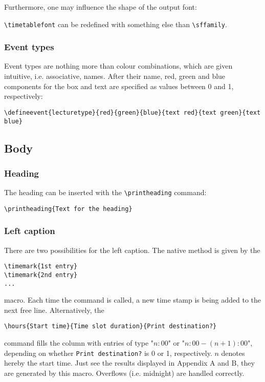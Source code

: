 \documentclass[a4paper,10pt]{article}
\begin{document}
Furthermore, one may influence the shape of the output font:
\begin{description}
\item \lstinline!\timetablefont! can be redefined with something else than \lstinline!\sffamily!.
\end{description}

\subsubsection{Event types}\label{defineevent}
Event types are nothing more than colour combinations, which are given intuitive, i.e. associative, names. After their name, red, green and blue components for the box and text are specified as values between 0 and 1, respectively:
\begin{lstlisting}
\defineevent{lecturetype}{red}{green}{blue}{text red}{text green}{text blue}
\end{lstlisting}

\subsection{Body}
\subsubsection{Heading}
The heading can be inserted with the \lstinline{\printheading} command:
\begin{lstlisting}
\printheading{Text for the heading}
\end{lstlisting}

\subsubsection{Left caption}
There are two possibilities for the left caption. The native method is given by the
\begin{lstlisting}
\timemark{1st entry}
\timemark{2nd entry}
...
\end{lstlisting}
macro. Each time the command is called, a new time stamp is being added to the next free line. Alternatively, the
\begin{lstlisting}
\hours{Start time}{Time slot duration}{Print destination?}
\end{lstlisting}
command fills the column with entries of type "$n:00$" or "$n:00 - (n+1):00$", depending on whether \lstinline{Print destination?} is 0 or 1, respectively. $n$ denotes hereby the start time. Just see the results displayed in Appendix A and B, they are generated by this macro. Overflows (i.e. midnight) are handled correctly.
\end{document}
